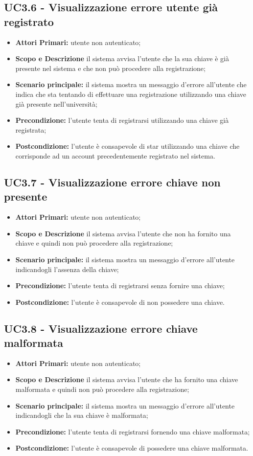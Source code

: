 \documentclass[AnalisiDeiRequisiti.tex]{subfiles}
\begin{document}
\subsection{UC3.6 - Visualizzazione errore utente già registrato}
\begin{itemize}
	\item \textbf{Attori Primari:} utente non autenticato;
	\item \textbf{Scopo e Descrizione} il sistema avvisa l'utente che la sua chiave è già presente nel sistema e che non può procedere alla registrazione;
	\item \textbf{Scenario principale:} il sistema mostra un messaggio d'errore all'utente che indica che sta tentando di effettuare una registrazione utilizzando una chiave già presente nell'università;
	\item \textbf{Precondizione:} l'utente tenta di registrarsi utilizzando una chiave già registrata;
	\item \textbf{Postcondizione:} l'utente è consapevole di star utilizzando una chiave che corrisponde ad un account precedentemente registrato nel sistema.
\end{itemize}
\subsection{UC3.7 - Visualizzazione errore chiave non presente}
\begin{itemize}
	\item \textbf{Attori Primari:} utente non autenticato;
	\item \textbf{Scopo e Descrizione} il sistema avvisa l'utente che non ha fornito una chiave e quindi non può procedere alla registrazione;
	\item \textbf{Scenario principale:} il sistema mostra un messaggio d'errore all'utente indicandogli l'assenza della chiave;
	\item \textbf{Precondizione:} l'utente tenta di registrarsi senza fornire una chiave;
	\item \textbf{Postcondizione:} l'utente è consapevole di non possedere una chiave.
\end{itemize}
\subsection{UC3.8 - Visualizzazione errore chiave malformata}
\begin{itemize}
	\item \textbf{Attori Primari:} utente non autenticato;
	\item \textbf{Scopo e Descrizione} il sistema avvisa l'utente che ha fornito una chiave malformata e quindi non può procedere alla registrazione;
	\item \textbf{Scenario principale:} il sistema mostra un messaggio d'errore all'utente indicandogli che la sua chiave è malformata;
	\item \textbf{Precondizione:} l'utente tenta di registrarsi fornendo una chiave malformata;
	\item \textbf{Postcondizione:} l'utente è consapevole di possedere una chiave malformata.
\end{itemize}
\end{document}
